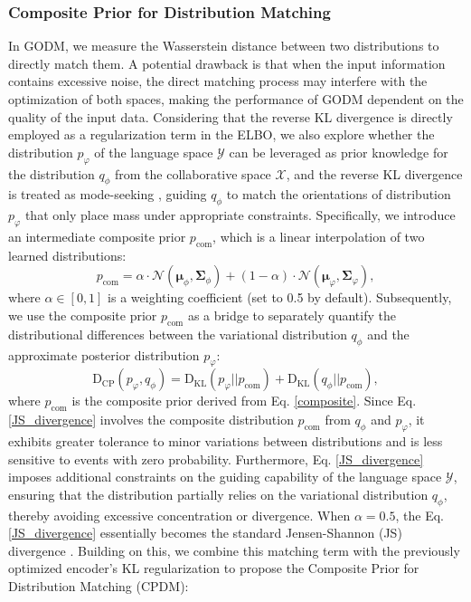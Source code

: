 \documentclass[sigconf]{acmart}
\begin{document}
\subsubsection{\textbf{Composite Prior for Distribution Matching}}
In GODM, we measure the Wasserstein distance between two distributions to directly match them. A potential drawback is that when the input information contains excessive noise, the direct matching process may interfere with the optimization of both spaces, making the performance of GODM dependent on the quality of the input data. Considering that the reverse KL divergence is directly employed as a regularization term in the ELBO, we also explore whether the distribution $p_{\varphi}$ of the language space $\mathcal Y$ can be leveraged as prior knowledge for the distribution $q_{\phi}$ from the collaborative space $\mathcal X$, and the reverse KL divergence is treated as mode-seeking \cite{li2023mode}, guiding $q_{\phi}$ to match the orientations of distribution 
$p_{\varphi}$ that only place mass under appropriate constraints. Specifically, we introduce an intermediate composite prior $p_{\text{com}}$, which is a linear interpolation of two learned distributions:
\begin{equation}
\label{composite}
p_{\text{com}}=\alpha \cdot \mathcal N(\boldsymbol{\mu}_{\phi}, \boldsymbol{\Sigma}_{\phi}) + (1 - \alpha) \cdot \mathcal N(\boldsymbol{\mu}_{\varphi}, \boldsymbol{\Sigma}_{\varphi}), 
\end{equation}
where $\alpha \in [0, 1]$ is a weighting coefficient (set to 0.5 by default). Subsequently, we use the composite prior $p_{\text{com}}$ as a bridge to separately quantify the distributional differences between the variational distribution $q_{\phi}$ and the approximate posterior distribution $p_{\varphi}$:
\begin{equation}
\label{JS_divergence}
\text{D}_{\text{CP}}(p_\varphi, q_\phi) = \text{D}_{\text{KL}}(p_\varphi||p_{\text{com}}) + \text{D}_{\text{KL}}(q_\phi || p_{\text{com}}),
\end{equation}
where $p_{\text{com}}$ is the composite prior derived from Eq. \ref{composite}. Since Eq. \ref{JS_divergence} involves the composite distribution $p_{\text{com}}$ from $q_{\phi}$ and $p_{\varphi}$, it exhibits greater tolerance to minor variations between distributions and is less sensitive to events with zero probability. Furthermore, Eq. \ref{JS_divergence} imposes additional constraints on the guiding capability of the language space $\mathcal Y$, ensuring that the distribution partially relies on the variational distribution $q_{\phi}$, thereby avoiding excessive concentration or divergence. When $\alpha=0.5$, the Eq. \ref{JS_divergence} essentially becomes the standard Jensen-Shannon (JS) divergence \cite{englesson2021generalized}. Building on this, we combine this matching term with the previously optimized encoder's KL regularization to propose the Composite Prior for Distribution Matching (CPDM):
\end{document}
